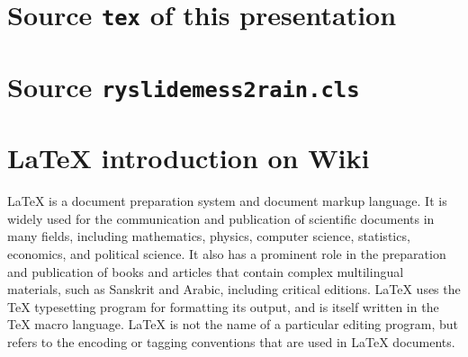 \documentclass{ryslidemess2rain}
\begin{document}
\newpage\section{Source {\tt tex} of this presentation}
\newpage\section{Source {\tt ryslidemess2rain.cls}}
\newpage\section{\LaTeX{} introduction on Wiki}
\LaTeX{} is a document preparation system and document markup language.
It is widely used for the communication and publication of scientific documents in many fields,
including mathematics, physics, computer science, statistics, economics, and political science.
It also has a prominent role in the preparation and publication of books %
and articles that contain complex multilingual materials,
such as Sanskrit and Arabic, including critical editions.
\LaTeX{} uses the \TeX{} typesetting program for formatting its output,
and is itself written in the \TeX{} macro language.
\LaTeX{} is not the name of a particular editing program,
but refers to the encoding or tagging conventions that are used in \LaTeX{} documents.
\mybackcover
\end{document}
